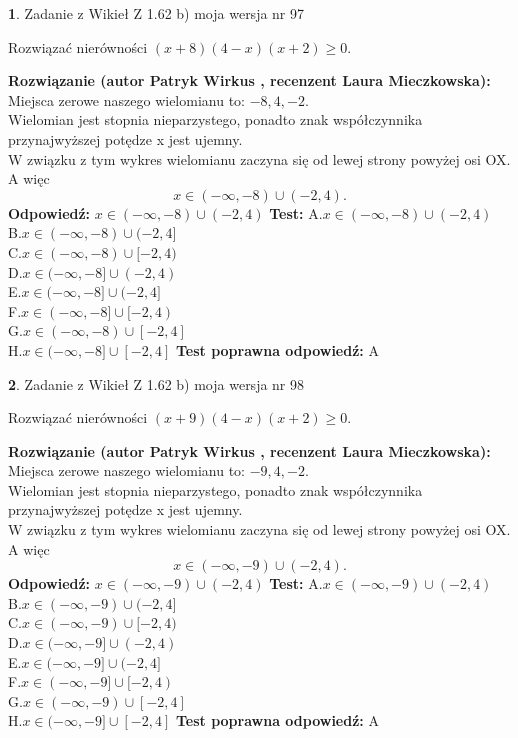 \documentclass[12pt, a4paper]{article}
\theoremstyle{definition} %
\newtheorem{zad}{}
\newcommand{\zadStart}[1]{\begin{zad}#1\newline}
\newcommand{\zadStop}{\end{zad}}
\newcommand{\rozwStart}[2]{\noindent \textbf{Rozwiązanie (autor #1 , recenzent #2): }\newline}
\newcommand{\rozwStop}{\newline}
\newcommand{\odpStart}{\noindent \textbf{Odpowiedź:}\newline}
\newcommand{\odpStop}{\newline}
\newcommand{\testStart}{\noindent \textbf{Test:}\newline}
\newcommand{\testStop}{\newline}
\newcommand{\kluczStart}{\noindent \textbf{Test poprawna odpowiedź:}\newline}
\newcommand{\kluczStop}{\newline}
\begin{document}
\zadStart{Zadanie z Wikieł Z 1.62 b) moja wersja nr 97}

Rozwiązać nierówności $(x+8)(4-x)(x+2)\ge0$.
\zadStop
\rozwStart{Patryk Wirkus}{Laura Mieczkowska}
Miejsca zerowe naszego wielomianu to: $-8, 4, -2$.\\
Wielomian jest stopnia nieparzystego, ponadto znak współczynnika przy\linebreak najwyższej potędze x jest ujemny.\\ W związku z tym wykres wielomianu zaczyna się od lewej strony powyżej osi OX. A więc $$x \in (-\infty,-8) \cup (-2,4).$$
\rozwStop
\odpStart
$x \in (-\infty,-8) \cup (-2,4)$
\odpStop
\testStart
A.$x \in (-\infty,-8) \cup (-2,4)$\\
B.$x \in (-\infty,-8) \cup (-2,4]$\\
C.$x \in (-\infty,-8) \cup [-2,4)$\\
D.$x \in (-\infty,-8] \cup (-2,4)$\\
E.$x \in (-\infty,-8] \cup (-2,4]$\\
F.$x \in (-\infty,-8] \cup [-2,4)$\\
G.$x \in (-\infty,-8) \cup [-2,4]$\\
H.$x \in (-\infty,-8] \cup [-2,4]$
\testStop
\kluczStart
A
\kluczStop



\zadStart{Zadanie z Wikieł Z 1.62 b) moja wersja nr 98}

Rozwiązać nierówności $(x+9)(4-x)(x+2)\ge0$.
\zadStop
\rozwStart{Patryk Wirkus}{Laura Mieczkowska}
Miejsca zerowe naszego wielomianu to: $-9, 4, -2$.\\
Wielomian jest stopnia nieparzystego, ponadto znak współczynnika przy\linebreak najwyższej potędze x jest ujemny.\\ W związku z tym wykres wielomianu zaczyna się od lewej strony powyżej osi OX. A więc $$x \in (-\infty,-9) \cup (-2,4).$$
\rozwStop
\odpStart
$x \in (-\infty,-9) \cup (-2,4)$
\odpStop
\testStart
A.$x \in (-\infty,-9) \cup (-2,4)$\\
B.$x \in (-\infty,-9) \cup (-2,4]$\\
C.$x \in (-\infty,-9) \cup [-2,4)$\\
D.$x \in (-\infty,-9] \cup (-2,4)$\\
E.$x \in (-\infty,-9] \cup (-2,4]$\\
F.$x \in (-\infty,-9] \cup [-2,4)$\\
G.$x \in (-\infty,-9) \cup [-2,4]$\\
H.$x \in (-\infty,-9] \cup [-2,4]$
\testStop
\kluczStart
A
\kluczStop
\end{document}
